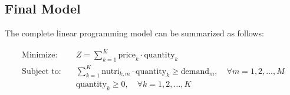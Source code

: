 \documentclass{article}
\begin{document}
\subsection*{Final Model}
The complete linear programming model can be summarized as follows:

\begin{align*}
\text{Minimize:} & \quad Z = \sum_{k=1}^{K} \text{price}_{k} \cdot \text{quantity}_{k} \\
\text{Subject to:} & \quad \sum_{k=1}^{K} \text{nutri}_{k, m} \cdot \text{quantity}_{k} \geq \text{demand}_{m}, \quad \forall m = 1, 2, \ldots, M \\
& \quad \text{quantity}_{k} \geq 0, \quad \forall k = 1, 2, \ldots, K
\end{align*}
\end{document}
